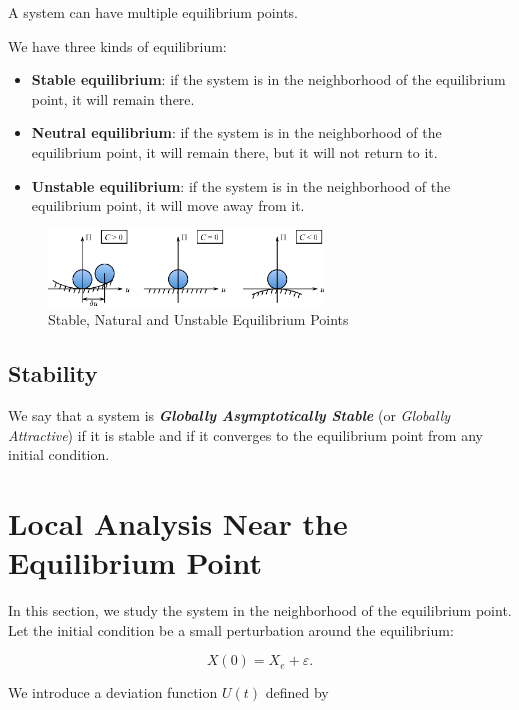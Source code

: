 \begin{tipsblock}[Eq. points]
A system can have multiple equilibrium points.
\end{tipsblock}

We have three kinds of equilibrium:

\begin{itemize}
    \item \textbf{Stable equilibrium}: if the system is in the neighborhood of the equilibrium point, it will remain there.
    \item \textbf{Neutral equilibrium}: if the system is in the neighborhood of the equilibrium point, it will remain there, but it will not return to it.
    \item \textbf{Unstable equilibrium}: if the system is in the neighborhood of the equilibrium point, it will move away from it.
\end{itemize}

\begin{figure}[H]
    \centering
    \includegraphics[width=0.65\textwidth]{assets/eq_points.png}
    \caption{Stable, Natural and Unstable Equilibrium Points \cite{stability}}
\end{figure}

\subsection{Stability}

We say that a system is \textbf{\textit{Globally Asymptotically Stable}} (or \textit{Globally Attractive}) if it is stable and if it converges to the equilibrium point from any initial condition.

\newpage
\section{Local Analysis Near the Equilibrium Point}

In this section, we study the system in the neighborhood of the equilibrium point. Let the initial condition be a small perturbation around the equilibrium:

$$
X(0) = X_e + \varepsilon.
$$

We introduce a deviation function $U(t)$ defined by

